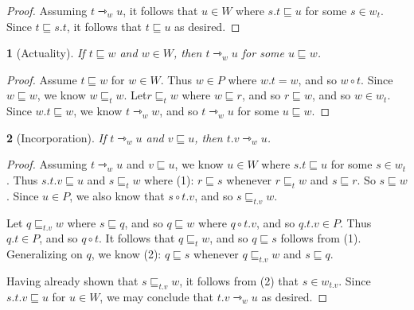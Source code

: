 \documentclass[a4paper, 11pt]{article} %
\theoremstyle{Pthm}
\newtheorem{Pthm}{}[section]%
\begin{document}
\begin{proof}
  Assuming $t \rightarrowtriangle_w u$, it follows that $u \in W$ where $s.t \sqsubseteq u$ for some $s \in w_t$.
  Since $t \sqsubseteq s.t$, it follows that $t \sqsubseteq u$ as desired. 
\end{proof}




\begin{Pthm}[\sc Actuality] \label{app:Actuality}
  If $t \sqsubseteq w$ and $w \in W$, then $t \rightarrowtriangle_w u$ for some $u \sqsubseteq w$. 
\end{Pthm}

\begin{proof}
  Assume $t \sqsubseteq w$ for $w \in W$. 
  Thus $w \in P$ where $w.t = w$, and so $w \circ t$.
  Since $w \sqsubseteq w$, we know $w \sqsubseteq_t w$.
  Let$r \sqsubseteq_t w$ where $w \sqsubseteq r$, and so $r \sqsubseteq w$, and so $w \in w_t$.
  Since $w.t \sqsubseteq w$, we know $t \rightarrowtriangle_w w$, and so $t \rightarrowtriangle_w u$ for some $u \sqsubseteq w$. 
\end{proof}





\begin{Pthm}[\sc Incorporation] \label{app:Incorporation}
  If $t \rightarrowtriangle_w u$ and $v \sqsubseteq u$, then $t.v \rightarrowtriangle_w u$. 
\end{Pthm}

\begin{proof}
  Assuming $t \rightarrowtriangle_w u$ and $v \sqsubseteq u$, we know $u \in W$ where $s.t \sqsubseteq u$ for some $s \in w_t$.
  Thus $s.t.v \sqsubseteq u$ and $s \sqsubseteq_t w$ where (1): $r \sqsubseteq s$ whenever $r \sqsubseteq_t w$ and $s \sqsubseteq r$.
  So $s \sqsubseteq w$.
  Since $u \in P$, we also know that $s \circ t.v$, and so $s \sqsubseteq_{t.v} w$.

  Let $q \sqsubseteq_{t.v} w$ where $s \sqsubseteq q$, and so $q \sqsubseteq w$ where $q \circ t.v$, and so $q.t.v \in P$. 
  Thus $q.t \in P$, and so $q \circ t$.
  It follows that $q \sqsubseteq_t w$, and so $q \sqsubseteq s$ follows from (1). 
  Generalizing on $q$, we know (2): $q \sqsubseteq s$ whenever $q \sqsubseteq_{t.v} w$ and $s \sqsubseteq q$.

  Having already shown that $s \sqsubseteq_{t.v} w$, it follows from (2) that $s \in w_{t.v}$.
  Since $s.t.v \sqsubseteq u$ for $u \in W$, we may conclude that $t.v \rightarrowtriangle_w u$ as desired. 
\end{proof}
\end{document}
